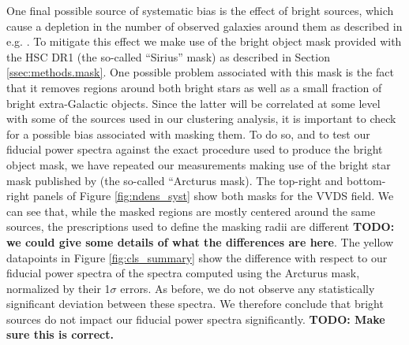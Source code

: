 \documentclass[a4paper,11pt]{article}
\newcommand{\todo}[1]{{\bf TODO: #1}}
\begin{document}
      One final possible source of systematic bias is the effect of bright sources, which cause a depletion in the number of observed galaxies around them as described in e.g. \cite{2018PASJ...70S...7C}. To mitigate this effect we make use of the bright object mask provided with the HSC DR1 (the so-called ``Sirius'' mask) as described in Section \ref{ssec:methods.mask}. One possible problem associated with this mask is the fact that it removes regions around both bright stars as well as a small fraction of bright extra-Galactic objects. Since the latter will be correlated at some level with some of the sources used in our clustering analysis, it is important to check for a possible bias associated with masking them. To do so, and to test our fiducial power spectra against the exact procedure used to produce the bright object mask, we have repeated our measurements making use of the bright star mask published by \cite{2018PASJ...70S...7C} (the so-called ``Arcturus mask). The top-right and bottom-right panels of Figure \ref{fig:ndens_syst} show both masks for the VVDS field. We can see that, while the masked regions are mostly centered around the same sources, the prescriptions used to define the masking radii are different \todo{we could give some details of what the differences are here}. The yellow datapoints in Figure \ref{fig:cls_summary} show the difference with respect to our fiducial power spectra of the spectra computed using the Arcturus mask, normalized by their 1$\sigma$ errors. As before, we do not observe any statistically significant deviation between these spectra. We therefore conclude that bright sources do not impact our fiducial power spectra significantly. \todo{Make sure this is correct.}
      
\end{document}
